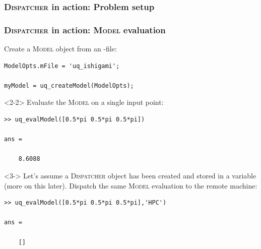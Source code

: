\documentclass[]{rsuqbeamernew}
\begin{document}
\begin{frame}[fragile]
\frametitle<1>{\textsc{Dispatcher} in action: Problem setup}
\frametitle<2->{\textsc{Dispatcher} in action: \textsc{Model} evaluation}

Create a \textsc{Model} object from an -file:
\begin{lstlisting}[basicstyle=\scriptsize]
ModelOpts.mFile = 'uq_ishigami';

myModel = uq_createModel(ModelOpts);
\end{lstlisting}

\begin{onlyenv}<2-2>
Evaluate the \textsc{Model} on a single input point:
\begin{lstlisting}[basicstyle=\scriptsize,numbers=none]
>> uq_evalModel([0.5*pi 0.5*pi 0.5*pi])

ans =
  
    8.6088
\end{lstlisting}
\end{onlyenv}

\begin{onlyenv}<3->
Let's assume a \textsc{Dispatcher} object has been created
and stored in a variable  ({\altx more on this later}).
Dispatch the same \textsc{Model} evaluation to the remote machine:
\begin{lstlisting}[basicstyle=\scriptsize,numbers=none]
>> uq_evalModel([0.5*pi 0.5*pi 0.5*pi],'HPC')
  
ans =
    
    []
\end{lstlisting}
\end{onlyenv}

  
\end{frame}
\end{document}
